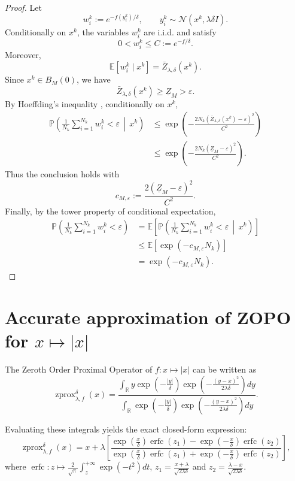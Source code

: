 \documentclass{article}
\newcommand{\zprox}{\ensuremath{\operatorname{zprox}}}
\begin{document}
\begin{proof}
Let
\[
    w_i^k:=e^{-f(y_i^k)/\delta},
    \qquad
    y_i^k\sim\mathcal N(x^k,\lambda\delta I).
\]
Conditionally on \(x^k\), the variables \(w_i^k\) are i.i.d. and satisfy
\[
    0<w_i^k\le C:=e^{-\underline f/\delta}.
\]
Moreover,
\[
    \mathbb{E}[w_i^k\mid x^k]
    =
    \bar Z_{\lambda,\delta}(x^k).
\]
Since \(x^k\in B_M(0)\), we have
\[
    \bar Z_{\lambda,\delta}(x^k)\ge \underline Z_M>\varepsilon.
\]
By Hoeffding's inequality \cite[Theorem 2.8]{Boucheron2013}, conditionally on \(x^k\),
\[
\begin{aligned}
\mathbb{P}\left(
    \frac1{N_k}\sum_{i=1}^{N_k}w_i^k<\varepsilon
    \,\middle|\,x^k
\right)
&\le
\exp\left(
-\frac{2N_k(\bar Z_{\lambda,\delta}(x^k)-\varepsilon)^2}{C^2}
\right)  \\
&\le
\exp\left(
-\frac{2N_k(\underline Z_M-\varepsilon)^2}{C^2}
\right).
\end{aligned}
\]
Thus the conclusion holds with
\[
    c_{M,\varepsilon}
    :=
    \frac{2(\underline Z_M-\varepsilon)^2}{C^2}.
\]
Finally, by the tower property of conditional expectation,
\[
\begin{aligned}
\mathbb{P}\left(
    \frac1{N_k}\sum_{i=1}^{N_k}w_i^k<\varepsilon
\right)
&=
\mathbb{E}\left[
\mathbb{P}\left(
    \frac1{N_k}\sum_{i=1}^{N_k}w_i^k<\varepsilon
    \,\middle|\, x^k
\right)
\right] \\
&\le
\mathbb{E}\left[
\exp(-c_{M,\varepsilon}N_k)
\right] \\
&=
\exp(-c_{M,\varepsilon}N_k).
\end{aligned}
\]
\end{proof}


\section{Accurate approximation of ZOPO for \(x\mapsto |x|\)}
\label{app:zopo_||}

The Zeroth Order Proximal Operator of \(f:x\mapsto|x|\) can be written as
\begin{equation}
    \zprox^{\delta}_{\lambda, f}(x) = \frac{\int_{\mathbb{R}} y \exp\left(-\frac{|y|}{\delta}\right) \exp\left(-\frac{(y-x)^2}{2\lambda\delta}\right) dy}{\int_{\mathbb{R}} \exp\left(-\frac{|y|}{\delta}\right) \exp\left(-\frac{(y-x)^2}{2\lambda\delta}\right) dy}.
\end{equation}

Evaluating these integrals yields the exact closed-form expression:
\begin{equation}
    \label{eq:zopo_unstable}
    \zprox^{\delta}_{\lambda, f}(x) = x + \lambda \left[ \frac{\exp\left(\frac{x}{\delta}\right) \operatorname{erfc}(z_1) - \exp\left(-\frac{x}{\delta}\right) \operatorname{erfc}(z_2)}{\exp\left(\frac{x}{\delta}\right) \operatorname{erfc}(z_1) + \exp\left(-\frac{x}{\delta}\right) \operatorname{erfc}(z_2)} \right],
\end{equation}
where \(\operatorname{erfc}:z\mapsto \frac{2}{\sqrt{\pi}}\int_z^{+\infty}\exp(-t^2)dt\), \(z_1 = \frac{x + \lambda}{\sqrt{2\lambda\delta}}\) and \(z_2 = \frac{\lambda - x}{\sqrt{2\lambda\delta}}\).
\end{document}
